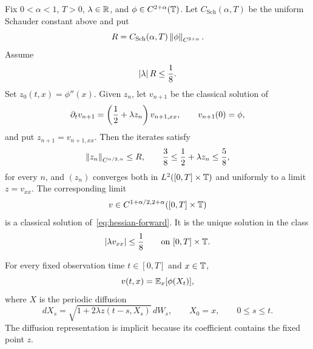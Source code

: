 \begin{theorem}
\label{thm:deterministic-iteration}
Fix $0<\alpha<1$, $T>0$, $\lambda\in\mathbb R$, and $\phi\in C^{2+\alpha}(\mathbb T)$. Let $C_{\mathrm{Sch}}(\alpha,T)$ be the uniform Schauder constant above and put
\begin{equation*}
  R
  =
  C_{\mathrm{Sch}}(\alpha,T)
  \left\lVert\phi\right\rVert_{C^{2+\alpha}}.
\end{equation*}
Assume
\begin{equation}
  \left|\lambda\right| R\leq\frac18.
  \label{eq:deterministic-smallness}
\end{equation}
Set $z_0(t,x)=\phi''(x)$. Given $z_n$, let $v_{n+1}$ be the classical solution of
\begin{equation*}
  \partial_tv_{n+1}
  =
  \left(\frac12+\lambda z_n\right)v_{n+1,xx},
  \qquad
  v_{n+1}(0)=\phi,
\end{equation*}
and put $z_{n+1}=v_{n+1,xx}$. Then the iterates satisfy
\begin{equation*}
  \left\lVert z_n\right\rVert_{C^{\alpha/2,\alpha}}
  \leq R,
  \qquad
  \frac38\leq\frac12+\lambda z_n\leq\frac58,
\end{equation*}
for every $n$, and $(z_n)$ converges both in $L^2([0,T]\times\mathbb T)$ and uniformly to a limit $z=v_{xx}$. The corresponding limit
\begin{equation*}
  v\in C^{1+\alpha/2,2+\alpha}([0,T]\times\mathbb T)
\end{equation*}
is a classical solution of~\eqref{eq:hessian-forward}. It is the unique solution in the class
\begin{equation*}
  \left|\lambda v_{xx}\right|\leq\frac18
  \qquad\text{on }[0,T]\times\mathbb T.
\end{equation*}

For every fixed observation time $t\in[0,T]$ and $x\in\mathbb T$,
\begin{equation*}
  v(t,x)=\mathbb E_x[\phi(X_t)],
\end{equation*}
where $X$ is the periodic diffusion
\begin{equation*}
  dX_s
  =
  \sqrt{1+2\lambda z(t-s,X_s)}\,dW_s,
  \qquad
  X_0=x,
  \qquad 0\leq s\leq t.
\end{equation*}
The diffusion representation is implicit because its coefficient contains the fixed point $z$.
\end{theorem}

